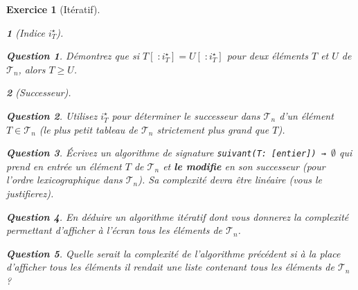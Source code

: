 \documentclass{article}
\theoremstyle{exostyle}
\newtheorem{exo}{Exercice}
\theoremstyle{partiestyle}
\newtheorem{partie}{}[exo]
\theoremstyle{questionstyle}
\newtheorem{questionpartie}{Question}[partie]
\begin{document}
\begin{exo}[Itératif]
\begin{partie}[Indice $i^\star_{T}$]
        \begin{questionpartie}
            Démontrez que si $T[\;:i^\star_{T}] = U[\;:i^\star_{T}]$ pour deux éléments $T$ et $U$ de $\mathcal{T}_n$, alors $T \geq U$.
        \end{questionpartie}
    \end{partie}
    \begin{partie}[Successeur]
        \begin{questionpartie}
            Utilisez $i^\star_{T}$ pour déterminer le successeur dans $\mathcal{T}_n$ d'un élément $T \in \mathcal{T}_n$ (le plus petit tableau de $\mathcal{T}_n$ strictement plus grand que $T$).
        \end{questionpartie}
        \begin{questionpartie}
            Écrivez un algorithme de signature \verb|suivant(T: [entier]) → |$\emptyset$  qui prend en entrée un élément $T$ de $\mathcal{T}_n$ et {\bf le modifie} en son successeur (pour l'ordre lexicographique dans $\mathcal{T}_n$). Sa complexité devra être linéaire (vous le justifierez).
        \end{questionpartie}
        \begin{questionpartie}
            En déduire un algorithme itératif dont vous donnerez la complexité permettant d'afficher à l'écran tous les éléments de $\mathcal{T}_n$.
        \end{questionpartie}
        \begin{questionpartie}
            Quelle serait la complexité de l'algorithme précédent si à la place d'afficher tous les éléments il rendait une liste contenant tous les éléments de $\mathcal{T}_n$ ?
        \end{questionpartie}

    \end{partie}
\end{exo}
\end{document}
